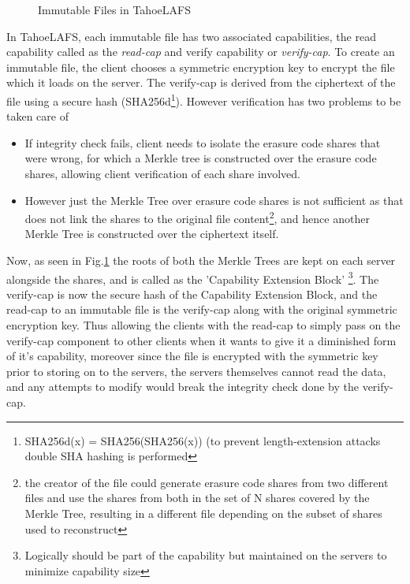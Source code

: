 \begin{figure}[h]
\centering
\caption{Immutable Files in TahoeLAFS}
\label{fig:immutable}
\end{figure}

In TahoeLAFS, each immutable file has two associated capabilities, the read capability called as the \textit{read-cap} and verify capability or 
\textit{verify-cap}. To create an immutable file, the client chooses a symmetric encryption key to encrypt the file which it loads on the server. The verify-cap is derived from the ciphertext of the file using a secure hash (SHA256d\footnote{SHA256d(x) = SHA256(SHA256(x)) (to prevent length-extension attacks double SHA hashing is performed}). However verification has two problems to be taken care of
\begin{itemize}
\item If integrity check fails, client needs to isolate the erasure code shares that were wrong, for which a Merkle tree is constructed over the erasure code shares, allowing client verification of each share involved.
\item However just the Merkle Tree over erasure code shares is not sufficient as that does not link the shares to the original file content\footnote{the creator of the file could generate erasure code shares from two different files and use the shares from both in the set of N shares covered by the Merkle Tree, resulting in a different file depending on the subset of shares used to reconstruct}, and hence another Merkle Tree is constructed over the ciphertext itself.
\end{itemize}
Now, as seen in Fig.\ref{fig:immutable} the roots of both the Merkle Trees are kept on each server alongside the shares, and is called as the 'Capability Extension Block' \footnote{Logically should be part of the capability but maintained on the servers to minimize capability size}. The verify-cap is now the secure hash of the Capability Extension Block, and the read-cap to an immutable file is the verify-cap along with the original symmetric encryption key. Thus allowing the clients with the read-cap to simply pass on the verify-cap component to other clients when it wants to give it a diminished form of it's capability, moreover since the file is encrypted with the symmetric key prior to storing on to the servers, the servers themselves cannot read the data, and any attempts to modify would break the integrity check done by the verify-cap.

